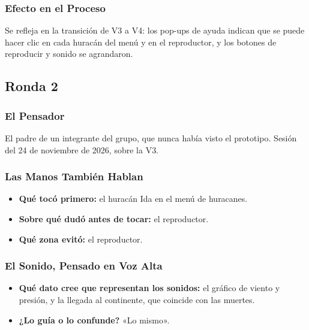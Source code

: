 \documentclass[11pt,a4paper]{article}
\begin{document}
	\subsubsection{Efecto en el Proceso}
	Se refleja en la transición de V3 a V4: los pop-ups de ayuda indican que se puede hacer clic en cada huracán del menú y en el reproductor, y los botones de reproducir y sonido se agrandaron.

	\subsection{Ronda 2}

	\subsubsection{El Pensador}
	El padre de un integrante del grupo, que nunca había visto el prototipo. Sesión del 24 de noviembre de 2026, sobre la V3.

	\subsubsection{Las Manos También Hablan}
	\begin{itemize}
		\item \textbf{Qué tocó primero:} el huracán Ida en el menú de huracanes.
		\item \textbf{Sobre qué dudó antes de tocar:} el reproductor.
		\item \textbf{Qué zona evitó:} el reproductor.
	\end{itemize}

	\subsubsection{El Sonido, Pensado en Voz Alta}
	\begin{itemize}
		\item \textbf{Qué dato cree que representan los sonidos:} el gráfico de viento y presión, y la llegada al continente, que coincide con las muertes.
		\item \textbf{¿Lo guía o lo confunde?} «Lo mismo».
	\end{itemize}
\end{document}

